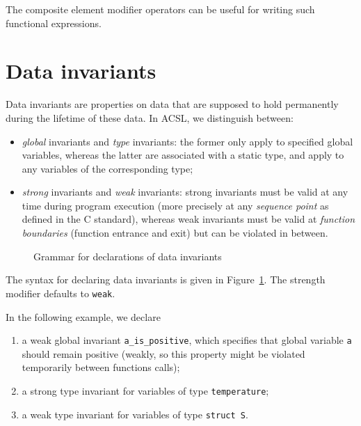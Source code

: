\begin{example}
  The composite element modifier operators 
  can be useful for writing such functional expressions.
\end{example}

\section{Data invariants}
\label{sec:invariants}
Data invariants are properties on data that are supposed to hold
permanently during the lifetime of these data. In ACSL, we distinguish
between:
\begin{itemize}
\item \emph{global} invariants and \emph{type} invariants: the former
  only apply to specified global variables, whereas the latter are
  associated with a static type, and apply to any variables of
  the corresponding type;
\item \emph{strong} invariants and \emph{weak} invariants:
  strong
  invariants must be valid at any time during program execution
  (more precisely at any \emph{sequence point} as defined in the C
  standard), whereas weak invariants must be valid at \emph{function
    boundaries} (function entrance and exit) but can be violated in
  between.
\end{itemize}

\begin{figure}[t]
  \begin{cadre}
      
    \end{cadre}
  \caption{Grammar for declarations of data invariants}
\label{fig:gram:datainvariants}
\end{figure}

The syntax for declaring data invariants is given in
Figure~\ref{fig:gram:datainvariants}. The strength modifier defaults
to \texttt{weak}.


\begin{example}
  In the following example, we declare
  \begin{enumerate}
  \item a weak global invariant \lstinline|a_is_positive|, which specifies that
    global variable \lstinline|a| should remain positive (weakly, so
    this property might be violated temporarily between functions
    calls);
  \item a strong type invariant for variables of type \lstinline|temperature|;
  \item a weak type invariant for variables of type \lstinline|struct S|.
  \end{enumerate}
\end{example}

